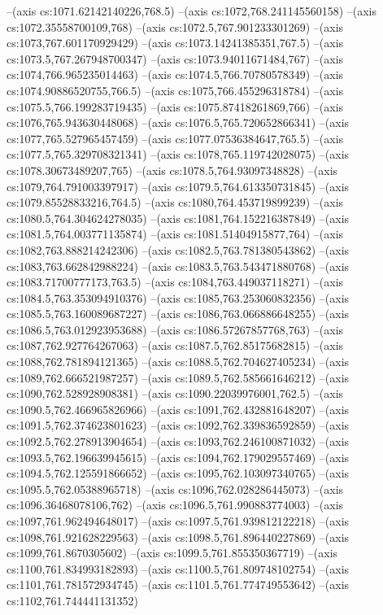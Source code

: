 --(axis cs:1071.62142140226,768.5)
--(axis cs:1072,768.241145560158)
--(axis cs:1072.35558700109,768)
--(axis cs:1072.5,767.901233301269)
--(axis cs:1073,767.601170929429)
--(axis cs:1073.14241385351,767.5)
--(axis cs:1073.5,767.267948700347)
--(axis cs:1073.94011671484,767)
--(axis cs:1074,766.965235014463)
--(axis cs:1074.5,766.70780578349)
--(axis cs:1074.90886520755,766.5)
--(axis cs:1075,766.455296318784)
--(axis cs:1075.5,766.199283719435)
--(axis cs:1075.87418261869,766)
--(axis cs:1076,765.943630448068)
--(axis cs:1076.5,765.720652866341)
--(axis cs:1077,765.527965457459)
--(axis cs:1077.07536384647,765.5)
--(axis cs:1077.5,765.329708321341)
--(axis cs:1078,765.119742028075)
--(axis cs:1078.30673489207,765)
--(axis cs:1078.5,764.93097348828)
--(axis cs:1079,764.791003397917)
--(axis cs:1079.5,764.613350731845)
--(axis cs:1079.85528833216,764.5)
--(axis cs:1080,764.453719899239)
--(axis cs:1080.5,764.304624278035)
--(axis cs:1081,764.152216387849)
--(axis cs:1081.5,764.003771135874)
--(axis cs:1081.51404915877,764)
--(axis cs:1082,763.888214242306)
--(axis cs:1082.5,763.781380543862)
--(axis cs:1083,763.662842988224)
--(axis cs:1083.5,763.543471880768)
--(axis cs:1083.71700777173,763.5)
--(axis cs:1084,763.449037118271)
--(axis cs:1084.5,763.353094910376)
--(axis cs:1085,763.253060832356)
--(axis cs:1085.5,763.160089687227)
--(axis cs:1086,763.066886648255)
--(axis cs:1086.5,763.012923953688)
--(axis cs:1086.57267857768,763)
--(axis cs:1087,762.927764267063)
--(axis cs:1087.5,762.85175682815)
--(axis cs:1088,762.781894121365)
--(axis cs:1088.5,762.704627405234)
--(axis cs:1089,762.666521987257)
--(axis cs:1089.5,762.585661646212)
--(axis cs:1090,762.528928908381)
--(axis cs:1090.22039976001,762.5)
--(axis cs:1090.5,762.466965826966)
--(axis cs:1091,762.432881648207)
--(axis cs:1091.5,762.374623801623)
--(axis cs:1092,762.339836592859)
--(axis cs:1092.5,762.278913904654)
--(axis cs:1093,762.246100871032)
--(axis cs:1093.5,762.196639945615)
--(axis cs:1094,762.179029557469)
--(axis cs:1094.5,762.125591866652)
--(axis cs:1095,762.103097340765)
--(axis cs:1095.5,762.05388965718)
--(axis cs:1096,762.028286445073)
--(axis cs:1096.36468078106,762)
--(axis cs:1096.5,761.990883774003)
--(axis cs:1097,761.962494648017)
--(axis cs:1097.5,761.939812122218)
--(axis cs:1098,761.921628229563)
--(axis cs:1098.5,761.896440227869)
--(axis cs:1099,761.8670305602)
--(axis cs:1099.5,761.855350367719)
--(axis cs:1100,761.834993182893)
--(axis cs:1100.5,761.809748102754)
--(axis cs:1101,761.781572934745)
--(axis cs:1101.5,761.774749553642)
--(axis cs:1102,761.744441131352)
